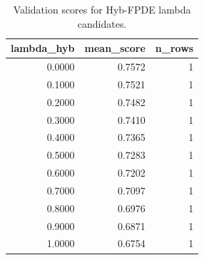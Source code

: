 \begin{table}[t]
\caption{Validation scores for Hyb-FPDE lambda candidates.}
\label{tab:lambda_distribution_computed}
\centering
\begin{tabular}{rrr}
\toprule
lambda\_hyb & mean\_score & n\_rows \\
\midrule
0.0000 & 0.7572 & 1 \\
0.1000 & 0.7521 & 1 \\
0.2000 & 0.7482 & 1 \\
0.3000 & 0.7410 & 1 \\
0.4000 & 0.7365 & 1 \\
0.5000 & 0.7283 & 1 \\
0.6000 & 0.7202 & 1 \\
0.7000 & 0.7097 & 1 \\
0.8000 & 0.6976 & 1 \\
0.9000 & 0.6871 & 1 \\
1.0000 & 0.6754 & 1 \\
\bottomrule
\end{tabular}

\end{table}
